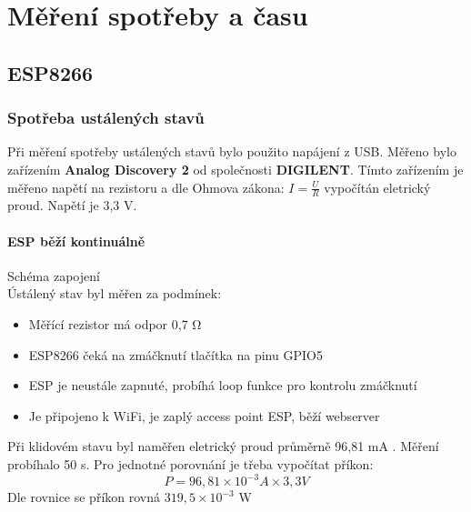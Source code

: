 \documentclass[a4paper, 12pt]{report}
\begin{document}

	\chapter{Měření spotřeby a času}
		\section{ESP8266}

			\subsection{Spotřeba ustálených stavů}
				Při měření spotřeby ustálených stavů bylo použito napájení z USB. Měřeno bylo zařízením \textbf{Analog Discovery 2} od společnosti \textbf{DIGILENT}. Tímto zařízením je měřeno napětí na rezistoru a dle Ohmova zákona: $I =\frac{U}{R}$ vypočítán eletrický proud. Napětí je 3,3 V.

				\subsubsection{ESP běží kontinuálně}
					Schéma zapojení  \\
					Ústálený stav byl měřen za podmínek:
					\begin{itemize}
						\item Měřící rezistor má odpor 0,7 \si{\ohm}
						\item ESP8266 čeká na zmáčknutí tlačítka na pinu GPIO5
						\item ESP je neustále zapnuté, probíhá loop funkce pro kontrolu zmáčknutí
						\item Je připojeno k WiFi, je zaplý access point ESP, běží webserver
					\end{itemize}
		 			Při klidovém stavu byl naměřen eletrický proud průměrně 96,81 \si{mA} . Měření probíhalo 50 \si{s}. Pro jednotné porovnání je třeba vypočítat příkon:
						$$P = 96,81 \times 10^{-3}\si{A} \times 3,3 \si{ V}$$
		 			Dle rovnice se příkon rovná $ 319,5 \times 10^{-3}$ \si{\watt}\\
\end{document}
